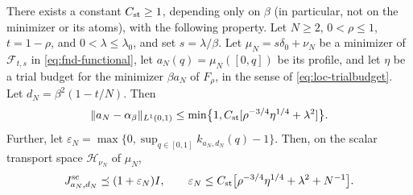\begin{proposition}
\label{prop:lz-stability}
There exists a constant $C_{\rm st}\ge1$, depending only on $\beta$ (in
particular, not on the minimizer or its atoms), with the following
property. Let $N\ge2$, $0<\rho\le1$, $t=1-\rho$, and
$0<\lambda\le\lambda_0$, and set $s=\lambda/\beta$. Let
$\mu_N=s\delta_0+\nu_N$ be a minimizer of $\mathcal F_{t,s}$ in
\eqref{eq:fnd-functional}, let $a_N(q)=\mu_N([0,q])$ be its profile,
and let $\eta$ be a trial budget for the minimizer $\beta a_N$ of
$F_\rho$, in the sense of \eqref{eq:loc-trialbudget}. Let
$d_N=\beta^2(1-t/N)$. Then
\begin{equation}\label{eq:lz-profileconvergence}
 \|a_N-\alpha_\beta\|_{L^1(0,1)}
 \le\min\bigl\{1,C_{\rm st}[\rho^{-3/4}\eta^{1/4}+\lambda^2]\bigr\}.
\end{equation}
Further, let
$\varepsilon_N=\max\{0,\sup_{q\in[0,1]}k_{a_N,d_N}(q)-1\}$. Then, on the
scalar transport space $\mathcal H_{\nu_N}$ of $\mu_N$,
\begin{equation}\label{eq:lz-stability}
 J^{\mathrm{sc}}_{a_N,d_N}\preceq(1+\varepsilon_N)I,
 \qquad
 \varepsilon_N\le C_{\rm st}
       \bigl[\rho^{-3/4}\eta^{1/4}+\lambda^2+N^{-1}\bigr].
\end{equation}
\end{proposition}

